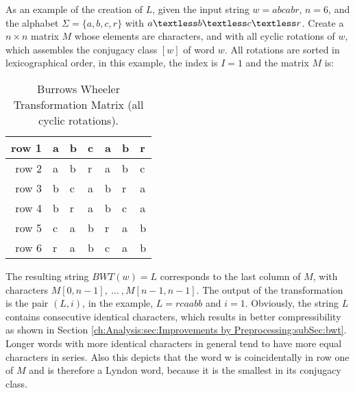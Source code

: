 \par {
As an example of the creation of $L$, given the input string $w = abcabr$, $n = 6$, and the alphabet $\Sigma = \{a,b,c,r\}$ with $a \textless b \textless c \textless r $. Create a $n \times n$ matrix $M$ whose elements are characters, and with all cyclic rotations of $w$, which assembles the conjugacy class $[w]$ of word $w$. All rotations are sorted in lexicographical order, in this example, the index is $I = 1$ and the matrix $M$ is:

\begin{table}[h]
	\centering
	\begin{tabular}{r|l|l|l|l|l|l}
		row 1 & a & b & c & a & b & r\\
		\hline
		row 2 & a & b & r & a & b & c\\
		\hline
		row 3 & b & c & a & b & r & a\\
		\hline
		row 4 & b & r & a & b & c & a\\
		\hline
		row 5 & c & a & b & r & a & b\\
		\hline
		row 6 & r & a & b & c & a & b		\label{tab:t10 bwt-example}
	\end{tabular}
	\caption{Burrows Wheeler Transformation Matrix (all cyclic rotations).}
\end{table}
The resulting string $BWT(w)=L$ corresponds to the last column of $M$, with characters $M[0,n -1],\: \dots \: ,M[n - 1, n - 1]$. The output of the transformation is the pair $(L, i)$, in the example, $L = rcaabb$ and $i = 1$. Obviously, the string $L$ contains consecutive identical characters, which results in better compressibility as shown in Section \ref{ch:Analysis:sec:Improvements by Preprocessing:subSec:bwt}. Longer words with more identical characters in general tend to have more equal characters in series. Also this depicts that the word w is coincidentally in row one of $M$ and is therefore a Lyndon word, because it is the smallest in its conjugacy class.
}

